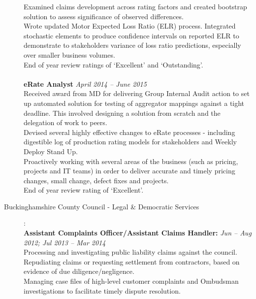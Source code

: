 \documentclass[11pt]{article}
\begin{document}
\begin{description}
\textbullet \quad Examined claims development across rating factors and created bootstrap solution to assess significance of observed differences. \\
\textbullet \quad Wrote updated Motor Expected Loss Ratio (ELR) process. Integrated stochastic elements to produce confidence intervals on reported ELR to demonstrate to stakeholders variance of loss ratio predictions, especially over smaller business volumes. \\
\textbullet \quad End of year review ratings of `Excellent' and `Outstanding'.
\\\\
\textbf{eRate Analyst} \emph{April 2014 -- June 2015}\\
\textbullet \quad Received award from MD for delivering Group Internal Audit action to set up automated solution for testing of aggregator mappings against a tight deadline. This involved designing a solution from scratch and the delegation of work to peers.\\
\textbullet \quad Devised several highly effective changes to eRate processes - including digestible log of production rating models for stakeholders and Weekly Deploy Stand Up. \\
\textbullet \quad Proactively working with several areas of the business (such as pricing, projects and IT teams) in order to deliver accurate and timely pricing changes, small change, defect fixes and projects.\\
\textbullet \quad End of year review rating of `Excellent'.


\item[Buckinghamshire County Council - Legal \& Democratic Services]:\\
\textbf{Assistant Complaints Officer/Assistant Claims Handler:} \emph{Jun -- Aug 2012; Jul 2013 -- Mar 2014}\\
\textbullet \quad Processing and investigating public liability claims against the council. Repudiating claims or requesting settlement from contractors, based on evidence of due diligence/negligence. \\
\textbullet \quad Managing case files of high-level customer complaints and Ombudsman investigations to facilitate timely dispute resolution.


\end{description}
\end{document}
